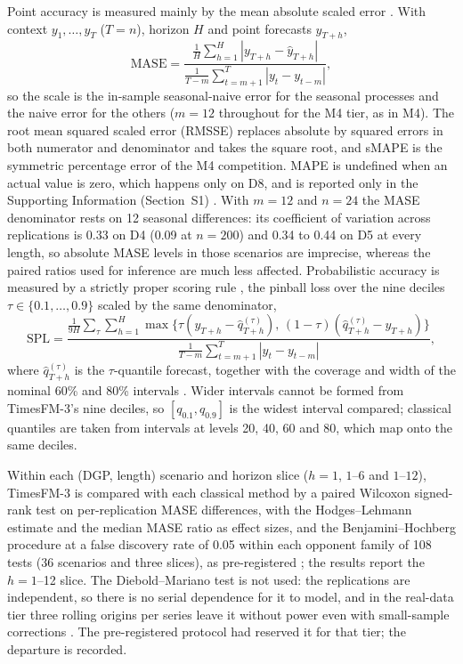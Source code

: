 \documentclass[ASNA]{USG}
\begin{document}
Point accuracy is measured mainly by the mean absolute scaled error \citep[MASE;][]{hyndman2006mase}.
With context $y_1, \dots, y_T$ ($T = n$), horizon $H$ and point forecasts $\hat{y}_{T+h}$,
\begin{equation}
\label{eq:mase}
\text{MASE} = \frac{\frac{1}{H}\sum_{h=1}^H |y_{T+h} - \hat{y}_{T+h}|}{\frac{1}{T-m}\sum_{t=m+1}^T |y_t - y_{t-m}|},
\end{equation}
so the scale is the in-sample seasonal-naive error for the seasonal processes and the naive error for the
others ($m = 12$ throughout for the M4 tier, as in M4). The root mean squared scaled error (RMSSE) replaces
absolute by squared errors in both numerator and denominator and takes the square root, and sMAPE is the
symmetric percentage error of the M4 competition. MAPE is undefined when an actual value is zero, which
happens only on D8, and is reported only in the Supporting Information (Section~S1)
\citep{hyndman2006mase, kolassa2016count}. With $m = 12$ and $n = 24$ the MASE denominator rests on 12
seasonal differences: its coefficient of variation across replications is 0.33 on D4 (0.09 at $n = 200$)
and 0.34 to 0.44 on D5 at every length, so absolute MASE levels in those scenarios are imprecise, whereas
the paired ratios used for inference are much less affected. Probabilistic accuracy is measured by a strictly proper scoring
rule \citep{gneiting2007scoring}, the pinball loss over the nine deciles $\tau \in \{0.1, \dots, 0.9\}$
scaled by the same denominator,
\begin{equation}
\label{eq:spl}
\text{SPL} = \frac{\frac{1}{9H} \sum_{\tau} \sum_{h=1}^H \max\{\tau(y_{T+h} - \hat{q}^{(\tau)}_{T+h}),\, (1-\tau)(\hat{q}^{(\tau)}_{T+h} - y_{T+h})\}}{\frac{1}{T-m}\sum_{t=m+1}^T |y_t - y_{t-m}|},
\end{equation}
where $\hat{q}^{(\tau)}_{T+h}$ is the $\tau$-quantile forecast, together with the coverage and width of
the nominal 60\% and 80\% intervals \citep{gneiting2007calibration}. Wider intervals cannot be formed from
TimesFM-3's nine deciles, so $[q_{0.1}, q_{0.9}]$ is the widest interval compared; classical quantiles are
taken from intervals at levels 20, 40, 60 and 80, which map onto the same deciles.

Within each (DGP, length) scenario and horizon slice ($h = 1$, $1$--$6$ and $1$--$12$), TimesFM-3 is compared
with each classical method by a paired Wilcoxon signed-rank test \citep{wilcoxon1945} on per-replication
MASE differences, with the Hodges--Lehmann estimate \citep{hodges1963} and the median MASE ratio as effect
sizes, and the Benjamini--Hochberg procedure at a false discovery rate of 0.05 within each opponent family
of 108 tests (36 scenarios and three slices), as pre-registered \citep{benjamini1995fdr}; the results report the
$h = 1$--12 slice. The Diebold--Mariano test \citep{diebold1995comparing} is not used: the replications are
independent, so there is no serial dependence for it to model, and in the real-data tier three rolling
origins per series leave it without power even with small-sample corrections \citep{harvey1997testing}. The
pre-registered protocol had reserved it for that tier; the departure is recorded.
\end{document}
